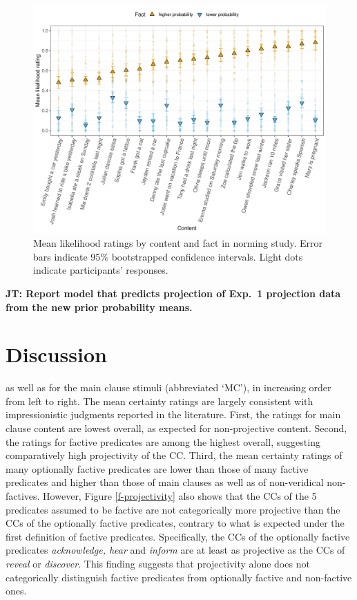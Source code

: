 \documentclass[11pt,fleqn]{article}
\newcommand{\6}{\mbox{$[\hspace*{-.6mm}[$}}
\newcommand{\9}{\mbox{$]\hspace*{-.6mm}]$}}
\newcommand{\jt}[1]{\textbf{\color{blue}JT: #1}}
\begin{document}
\begin{figure}[H]
\centering

\includegraphics[width=.75\paperwidth]{../../results/1-prior/graphs/ratings-for-CCs-identified-by-clause}

\caption{Mean likelihood ratings by content and fact in norming study. Error bars indicate 95\% bootstrapped confidence intervals. Light dots indicate participants' responses.}
\label{f-prior}
\end{figure}

\jt{Report model that predicts projection of Exp.~1 projection data from the new prior probability means.}


\section{Discussion}\label{s4}


as well as for the main clause stimuli (abbreviated `MC'), in increasing order from left to right. The mean certainty ratings are largely consistent with impressionistic judgments reported in the literature. First, the ratings for main clause content are lowest overall, as expected for non-projective content. Second, the ratings for factive predicates are among the highest overall, suggesting comparatively high projectivity of the CC. Third, the mean certainty ratings of many optionally factive predicates are lower than those of many factive predicates and higher than those of main clauses as well as of non-veridical non-factives. However, Figure \ref{f-projectivity} also shows that the CCs of the 5 predicates assumed to be factive are not categorically more projective than the CCs of the optionally factive predicates, contrary to what is expected under the first definition of factive predicates. Specifically, the CCs of the optionally factive predicates {\em acknowledge, hear} and {\em inform} are at least as projective as the CCs of {\em reveal} or {\em discover}. This finding suggests that projectivity alone does not categorically distinguish factive predicates from optionally factive and non-factive ones.
\end{document}

